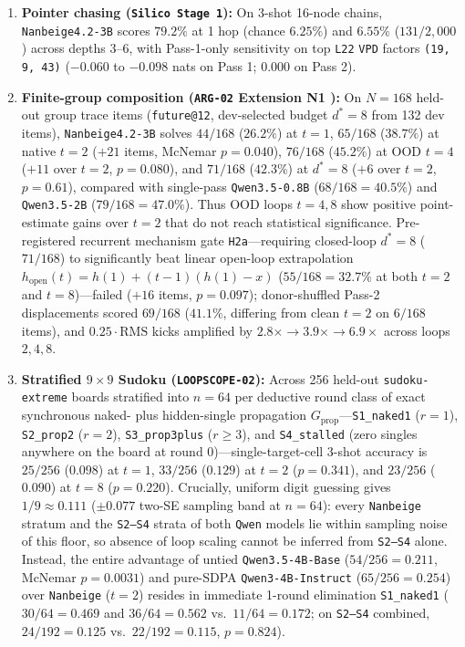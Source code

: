 \documentclass[10pt,letterpaper]{article}
\newcommand{\Gprop}{G_{\mathrm{prop}}}
\begin{document}
\begin{enumerate}[topsep=3pt,itemsep=2pt]
  \item \textbf{Pointer chasing (\texttt{Silico Stage 1}):} On 3-shot 16-node chains, \texttt{Nanbeige4.2-3B} scores $79.2\%$ at 1 hop (chance $6.25\%$) and $6.55\%$ ($131/2{,}000$) across depths 3--6, with Pass-1-only sensitivity on top \texttt{L22} \texttt{VPD} factors \texttt{(19, 9, 43)} ($-0.060$ to $-0.098$ nats on Pass 1; $0.000$ on Pass 2).
  \item \textbf{Finite-group composition (\texttt{ARG-02} Extension N1 \cite{dugan2026arg02}):} On $N=168$ held-out group trace items (\texttt{future@12}, dev-selected budget $d^*=8$ from 132 dev items), \texttt{Nanbeige4.2-3B} solves $44/168$ ($26.2\%$) at $t=1$, $65/168$ ($38.7\%$) at native $t=2$ ($+21$ items, McNemar $p=0.040$), $76/168$ ($45.2\%$) at OOD $t=4$ ($+11$ over $t=2$, $p=0.080$), and $71/168$ ($42.3\%$) at $d^*=8$ ($+6$ over $t=2$, $p=0.61$), compared with single-pass \texttt{Qwen3.5-0.8B} ($68/168 = 40.5\%$) and \texttt{Qwen3.5-2B} ($79/168 = 47.0\%$). Thus OOD loops $t=4,8$ show positive point-estimate gains over $t=2$ that do not reach statistical significance. Pre-registered recurrent mechanism gate \texttt{H2a}—requiring closed-loop $d^*=8$ ($71/168$) to significantly beat linear open-loop extrapolation $h_{\mathrm{open}}(t) = h(1) + (t-1)(h(1)-x)$ ($55/168 = 32.7\%$ at both $t=2$ and $t=8$)—failed ($+16$ items, $p=0.097$); donor-shuffled Pass-2 displacements scored $69/168$ ($41.1\%$, differing from clean $t=2$ on $6/168$ items), and $0.25\cdot\mathrm{RMS}$ kicks amplified by $2.8\times \to 3.9\times \to 6.9\times$ across loops $2, 4, 8$.
  \item \textbf{Stratified $9\times 9$ Sudoku (\texttt{LOOPSCOPE-02}):} Across 256 held-out \texttt{sudoku-extreme} boards stratified into $n=64$ per deductive round class of exact synchronous naked- plus hidden-single propagation $\Gprop$—\texttt{S1\_naked1} ($r=1$), \texttt{S2\_prop2} ($r=2$), \texttt{S3\_prop3plus} ($r\ge 3$), and \texttt{S4\_stalled} (zero singles anywhere on the board at round 0)—single-target-cell 3-shot accuracy is $25/256$ ($0.098$) at $t=1$, $33/256$ ($0.129$) at $t=2$ ($p=0.341$), and $23/256$ ($0.090$) at $t=8$ ($p=0.220$). Crucially, uniform digit guessing gives $1/9 \approx 0.111$ ($\pm 0.077$ two-SE sampling band at $n=64$): every \texttt{Nanbeige} stratum and the \texttt{S2--S4} strata of both \texttt{Qwen} models lie within sampling noise of this floor, so absence of loop scaling cannot be inferred from \texttt{S2--S4} alone. Instead, the entire advantage of untied \texttt{Qwen3.5-4B-Base} ($54/256 = 0.211$, McNemar $p=0.0031$) and pure-SDPA \texttt{Qwen3-4B-Instruct} ($65/256 = 0.254$) over \texttt{Nanbeige} ($t=2$) resides in immediate 1-round elimination \texttt{S1\_naked1} ($30/64 = 0.469$ and $36/64 = 0.562$ vs.\ $11/64 = 0.172$; on \texttt{S2--S4} combined, $24/192 = 0.125$ vs.\ $22/192 = 0.115$, $p=0.824$).
\end{enumerate}
\end{document}
